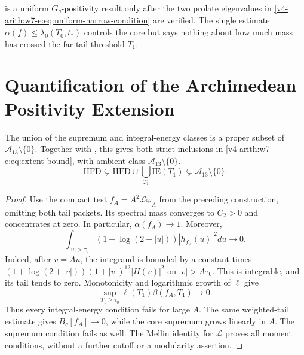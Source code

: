 \begin{remark}[significance]
\label{v4-arith:w7-e:rem:narrow-PW-significance}
 is a uniform
\(G_g\)-positivity result only after the two prolate eigenvalues in
\eqref{v4-arith:w7-e:eq:uniform-narrow-condition} are verified. The
single estimate \(\alpha(f)\leq\lambda_{0}(T_{0},t_{\ast})\) controls
the core but says nothing about how much mass has crossed the far-tail
threshold \(T_{1}\).
\end{remark}

\section{Quantification of the Archimedean Positivity Extension}
\label{v4-arith:w7-e:quantification}

\begin{theorem}
\label{v4-arith:w7-e:thm:extent}
The union of the supremum and integral-energy classes is a proper
subset of $\mathscr A_{13}\setminus\{0\}$.
Together with , this gives
both strict inclusions in \eqref{v4-arith:w7-e:eq:extent-bound},
with ambient class $\mathscr A_{13}\setminus\{0\}$.
\begin{equation}
\label{v4-arith:w7-e:eq:extent-bound}
 \mathrm{HFD}\subsetneq\mathrm{HFD}\cup\bigcup_{T_1}\mathrm{IE}(T_1)
 \subsetneq\mathscr A_{13}\setminus\{0\}.
\end{equation}
\end{theorem}
\begin{proof}
Use the compact test $f_A=A^2\mathcal L\varphi_A$ from the preceding
construction, omitting both tail packets.
Its spectral mass converges to $C_2>0$ and concentrates at zero.
In particular, $\alpha(f_A)\to1$. Moreover,
\[
 \int_{|u|>\tau_0}(1+\log(2+|u|))|h_{f_A}(u)|^2du\longrightarrow0.
\]
Indeed, after $v=Au$, the integrand is bounded by a constant times
$(1+\log(2+|v|))(1+|v|)^{12}|H(v)|^2$ on
$|v|>A\tau_0$. This is integrable, and its tail tends to zero.
Monotonicity and logarithmic growth of $\ell$ give
\[
 \sup_{T_1\ge \tau_0}\ell(T_1)\beta(f_A,T_1)\longrightarrow0.
\]
Thus every integral-energy condition fails for large $A$.
The same weighted-tail estimate gives $B_g[f_A]\to0$, while
the core supremum grows linearly in $A$.
The supremum condition fails as well.
The Mellin identity for $\mathcal L$ proves all moment conditions,
without a further cutoff or a modularity assertion.
\end{proof}

